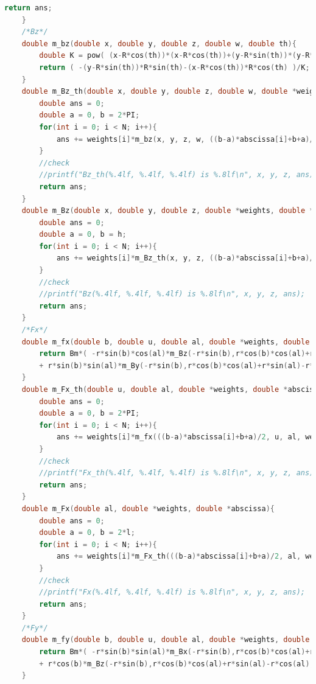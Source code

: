 \documentclass[AutoFakeBold]{LZUThesis}
\begin{document}
\begin{lstlisting}[language = C]
        return ans;
    }
    /*Bz*/
    double m_bz(double x, double y, double z, double w, double th){
        double K = pow( (x-R*cos(th))*(x-R*cos(th))+(y-R*sin(th))*(y-R*sin(th))+(z-w)*(z-w) , 1.5);
        return ( -(y-R*sin(th))*R*sin(th)-(x-R*cos(th))*R*cos(th) )/K;
    }
    double m_Bz_th(double x, double y, double z, double w, double *weights, double *abscissa){
        double ans = 0;
        double a = 0, b = 2*PI;
        for(int i = 0; i < N; i++){
            ans += weights[i]*m_bz(x, y, z, w, ((b-a)*abscissa[i]+b+a)/2)*(b-a)/2;
        }
        //check
        //printf("Bz_th(%.4lf, %.4lf, %.4lf) is %.8lf\n", x, y, z, ans);
        return ans;
    }
    double m_Bz(double x, double y, double z, double *weights, double *abscissa){
        double ans = 0;
        double a = 0, b = h;
        for(int i = 0; i < N; i++){
            ans += weights[i]*m_Bz_th(x, y, z, ((b-a)*abscissa[i]+b+a)/2, weights, abscissa)*(b-a)/2;
        }
        //check
        //printf("Bz(%.4lf, %.4lf, %.4lf) is %.8lf\n", x, y, z, ans);
        return ans;
    }
    /*Fx*/
    double m_fx(double b, double u, double al, double *weights, double *abscissa){
        return Bm*( -r*sin(b)*cos(al)*m_Bz(-r*sin(b),r*cos(b)*cos(al)+r*sin(al)-r*cos(al),r*cos(b)*sin(al)-d-u*cos(al)-r*sin(al),weights,abscissa) \
        + r*sin(b)*sin(al)*m_By(-r*sin(b),r*cos(b)*cos(al)+r*sin(al)-r*cos(al),r*cos(b)*sin(al)-d-u*cos(al)-r*sin(al),weights,abscissa));
    }
    double m_Fx_th(double u, double al, double *weights, double *abscissa){
        double ans = 0;
        double a = 0, b = 2*PI;
        for(int i = 0; i < N; i++){
            ans += weights[i]*m_fx(((b-a)*abscissa[i]+b+a)/2, u, al, weights, abscissa)*(b-a)/2;
        }
        //check
        //printf("Fx_th(%.4lf, %.4lf, %.4lf) is %.8lf\n", x, y, z, ans);
        return ans;
    }
    double m_Fx(double al, double *weights, double *abscissa){
        double ans = 0;
        double a = 0, b = 2*l;
        for(int i = 0; i < N; i++){
            ans += weights[i]*m_Fx_th(((b-a)*abscissa[i]+b+a)/2, al, weights, abscissa)*(b-a)/2;
        }
        //check
        //printf("Fx(%.4lf, %.4lf, %.4lf) is %.8lf\n", x, y, z, ans);
        return ans;
    }
    /*Fy*/
    double m_fy(double b, double u, double al, double *weights, double *abscissa){
        return Bm*( -r*sin(b)*sin(al)*m_Bx(-r*sin(b),r*cos(b)*cos(al)+r*sin(al)-r*cos(al),r*cos(b)*sin(al)-d-u*cos(al)-r*sin(al),weights,abscissa) \
        + r*cos(b)*m_Bz(-r*sin(b),r*cos(b)*cos(al)+r*sin(al)-r*cos(al),r*cos(b)*sin(al)-d-u*cos(al)-r*sin(al),weights,abscissa));
    }

\end{lstlisting}
\end{document}

